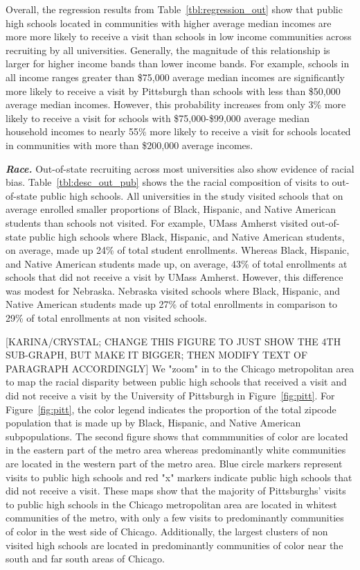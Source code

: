 \documentclass[twoside]{article}
\begin{document}
Overall, the regression results from Table~\ref{tbl:regression_out} show that public high schools located in communities with higher average median incomes are more more likely to receive a visit than schools in low income communities across recruiting by all universities. Generally, the magnitude of this relationship is larger for higher income bands than lower income bands. For example, schools in all income ranges greater than \$75,000 average median incomes are significantly more likely to receive a visit by Pittsburgh than schools with less than \$50,000 average median incomes. However, this probability increases from only 3\% more likely to receive a visit for schools with \$75,000-\$99,000 average median household incomes to nearly 55\% more likely to receive a visit for schools located in communities with more than \$200,000 average incomes.

\textbf{\textit{Race.}} Out-of-state recruiting across most universities also show evidence of racial bias. Table~\ref{tbl:desc_out_pub} shows the the racial composition of visits to out-of-state public high schools. All universities in the study visited schools that on average enrolled smaller proportions of Black, Hispanic, and Native American students than schools not visited. For example, UMass Amherst visited out-of-state public high schools where Black, Hispanic, and Native American students, on average, made up 24\% of total student enrollments. Whereas Black, Hispanic, and Native American students made up, on average, 43\% of total enrollments at schools that did not receive a visit by UMass Amherst. However, this difference was modest for Nebraska. Nebraska visited schools where Black, Hispanic, and Native American students made up 27\% of total enrollments in comparison to 29\% of total enrollments at non visited schools.



[KARINA/CRYSTAL; CHANGE THIS FIGURE TO JUST SHOW THE 4TH SUB-GRAPH, BUT MAKE IT BIGGER; THEN MODIFY TEXT OF PARAGRAPH ACCORDINGLY] We "zoom" in to the Chicago metropolitan area to map the racial disparity between public high schools that received a visit and did not receive a visit by the University of Pittsburgh in Figure~\ref{fig:pitt}. For Figure~\ref{fig:pitt}, the color legend indicates the proportion of the total zipcode population that is made up by Black, Hispanic, and Native American subpopulations. The second figure shows that commmunities of color are located in the eastern part of the metro area whereas predominantly white communities are located in the western part of the metro area. Blue circle markers represent visits to public high schools and red "x" markers indicate public high schools that did not receive a visit. These maps show that the majority of Pittsburghs' visits to public high schools in the Chicago metropolitan area are located in whitest communities of the metro, with only a few visits to predominantly communities of color in the west side of Chicago. Additionally, the largest clusters of non visited high schools are located in predominantly communities of color near the south and far south areas of Chicago.
\end{document}
